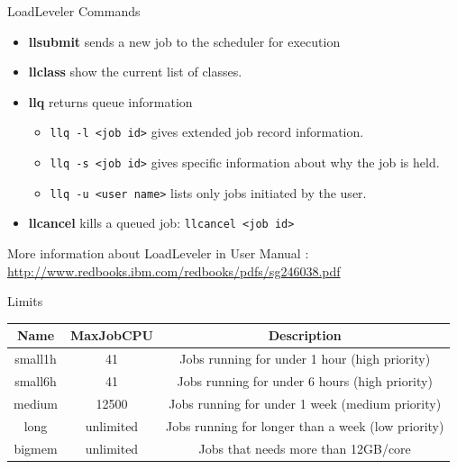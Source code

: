 \documentclass[final,t]{beamer}
\begin{document}
\begin{frame}[fragile]{}
\begin{columns}[t]
\begin{column}{.32\linewidth}
 
      \begin{block}{LoadLeveler Commands}
        \begin{itemize}
        \item  \textbf{llsubmit} sends a new job to the scheduler for execution
        \item  \textbf{llclass} show the current list of classes.
        \item  \textbf{llq} returns queue information 
         \begin{itemize}
              \item \verb|llq -l <job id>| gives extended job record information.
              \item \verb|llq -s <job id>| gives specific information about why the job is held.
              \item \verb|llq -u <user name>| lists only jobs initiated by the user.
         \end{itemize}
        \item \textbf{llcancel} kills a queued job: \verb|llcancel <job id>|
        \end{itemize}
       More information about LoadLeveler in User Manual : \url{http://www.redbooks.ibm.com/redbooks/pdfs/sg246038.pdf}
      \end{block}

      \begin{block}{Limits}
        \vspace*{-2ex}
      \begin{center}
      \begin{tabular}{|c|c|c|}
      \hline 
      \textbf{Name} & \textbf{MaxJobCPU} & \textbf{Description} \\ 
      \hline 
      small1h & 41 &  Jobs running for under 1 hour (high priority)\\ 
      \hline 
      small6h & 41 & Jobs running for under 6 hours  (high priority)\\ 
      \hline 
      medium & 12500 &  Jobs running for under 1 week  (medium priority)\\ 
      \hline 
      long & unlimited &  Jobs running for longer than a week  (low priority)\\ 
      \hline 
      bigmem & unlimited &  Jobs that needs more than 12GB/core\\ 
      \hline 
      \end{tabular} 
      \end{center}
        \vspace*{-2ex}
      \end{block}

 
    \end{column}
  \end{columns}
\end{frame}
\end{document}
